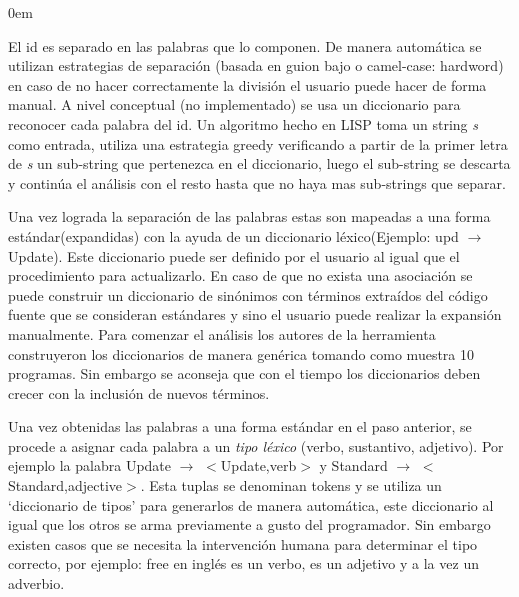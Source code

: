 \documentclass[a4paper,12pt]{report}
\begin{document}
\begin{description}
\itemsep0em%
\item[Segmentation:] El id es separado en las palabras que lo componen. De manera automática se utilizan estrategias de separación (basada en guion bajo o camel-case: hardword) en caso de no hacer correctamente la división el usuario puede hacer de forma manual. A nivel conceptual (no implementado) se usa un diccionario para reconocer cada palabra del id. Un algoritmo hecho en LISP toma un string \textit{s} como entrada, utiliza una estrategia greedy verificando a partir de la primer letra de \textit{s} un sub-string que pertenezca en el diccionario, luego el sub-string se descarta y continúa el análisis con el resto hasta que no haya mas sub-strings que separar\cite{BCPT99}.

\item[Standard Lexicon:] Una vez lograda la separación de las palabras estas son mapeadas a una forma estándar(expandidas) con la ayuda de un diccionario léxico\cite{BCPT99}(Ejemplo: \textsf{upd} $\rightarrow$ \textsf{Update}). Este diccionario puede ser definido por el usuario al igual que el procedimiento para actualizarlo. En caso de que no exista una asociación se puede construir un diccionario de sinónimos con términos extraídos del código fuente que se consideran estándares y sino el usuario puede realizar la expansión manualmente. Para comenzar el análisis los autores\cite{BCPT00} de la herramienta construyeron los diccionarios de manera genérica tomando como muestra 10 programas. Sin embargo se aconseja que con el tiempo los diccionarios deben crecer con la inclusión de nuevos términos.

\item[Tokenization:] Una vez obtenidas las palabras a una forma estándar en el paso anterior, se procede a asignar cada palabra a un \textit{tipo léxico} (verbo, sustantivo, adjetivo). Por ejemplo la palabra Update $\rightarrow$ $<$Update,verb$>$ y Standard $\rightarrow$ $<$Standard,adjective$>$. Esta tuplas se denominan tokens y se utiliza un `diccionario de tipos' para generarlos de manera automática, este diccionario al igual que los otros se arma previamente a gusto del programador\cite{BCPT99}. Sin embargo existen casos que se necesita la intervención humana para determinar el tipo correcto, por ejemplo: free en inglés es un verbo, es un adjetivo y a la vez un adverbio.%


\end{description}
\end{document}
